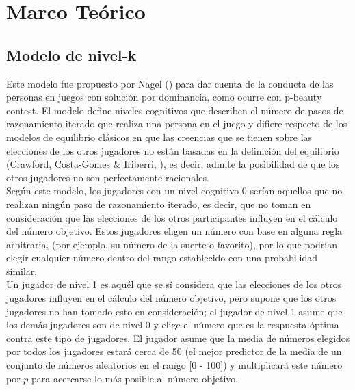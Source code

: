 \chapter{Marco Teórico} %

\label{Cap_SDT} %


\newcommand{\keyword}[1]{\textbf{#1}}
\newcommand{\tabhead}[1]{\textbf{#1}}
\newcommand{\code}[1]{\texttt{#1}}
\newcommand{\file}[1]{\texttt{\bfseries#1}}
\newcommand{\option}[1]{\texttt{\itshape#1}}


\section{Modelo de nivel-k}

Este modelo fue propuesto por Nagel (\citeyear{Nagel}) para dar cuenta de la conducta de las personas en juegos con solución por dominancia, como ocurre con p-beauty contest. El modelo define niveles cognitivos que describen el número de pasos de razonamiento iterado que realiza una persona en el juego y difiere respecto de los modelos de equilibrio clásicos en que las creencias que se tienen sobre las elecciones de los otros jugadores no están basadas en la definición del equilibrio (Crawford, Costa-Gomes & Iriberri, \citeyear{Crawford}), es decir, admite la posibilidad de que los otros jugadores no son perfectamente racionales.\\

Según este modelo, los jugadores con un nivel cognitivo 0 serían aquellos que no realizan ningún paso de razonamiento iterado, es decir, que no toman en consideración que las elecciones de los otros participantes inﬂuyen en el cálculo del número objetivo. Estos jugadores eligen un número con base en alguna regla arbitraria, (por ejemplo, su número de la suerte o favorito), por lo que podrían elegir cualquier número dentro del rango establecido con una probabilidad similar.\\

Un jugador de nivel 1 es aquél que se sí considera que las elecciones de los otros jugadores influyen en el cálculo del número objetivo, pero supone que los otros jugadores no han tomado esto en consideración; el jugador de nivel 1 asume que los demás jugadores son de nivel 0 y elige el número que es la respuesta óptima contra este tipo de jugadores. El jugador asume que la media de números elegidos por todos los jugadores estará cerca de 50 (el mejor predictor de la media de un conjunto de números aleatorios en el rango [0 - 100]) y multiplicará este número por $p$ para acercarse lo más posible al número objetivo.\\

